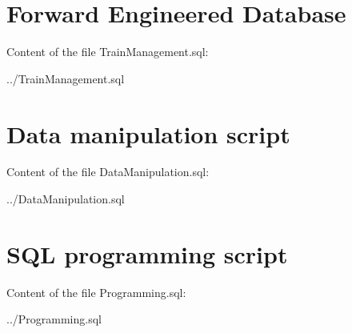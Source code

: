 \section{Forward Engineered Database} \label{app:db}

Content of the file TrainManagement.sql:


{../TrainManagement.sql}


\section{Data manipulation script} \label{app:data}

Content of the file DataManipulation.sql:


{../DataManipulation.sql}


\section{SQL programming script} \label{app:prog}

Content of the file Programming.sql:


{../Programming.sql}
